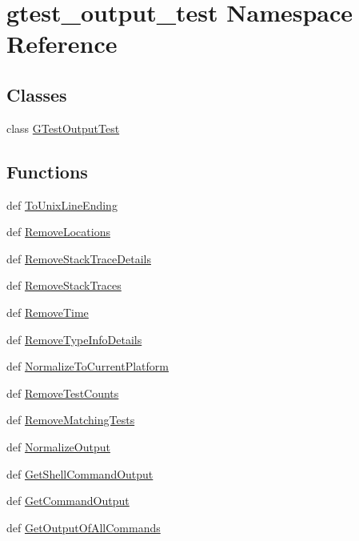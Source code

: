 \hypertarget{namespacegtest__output__test}{\section{gtest\-\_\-output\-\_\-test \-Namespace \-Reference}
\label{d6/dc2/namespacegtest__output__test}
}
\subsection*{\-Classes}
\begin{DoxyCompactItemize}
\item 
class \hyperlink{classgtest__output__test_1_1GTestOutputTest}{\-G\-Test\-Output\-Test}
\end{DoxyCompactItemize}
\subsection*{\-Functions}
\begin{DoxyCompactItemize}
\item 
def \hyperlink{namespacegtest__output__test_a3454cfbe1dc13123ffc8d35189acfc22}{\-To\-Unix\-Line\-Ending}
\item 
def \hyperlink{namespacegtest__output__test_a121831a3be4499f43226a849460076eb}{\-Remove\-Locations}
\item 
def \hyperlink{namespacegtest__output__test_a06f3f2b9517a19912a1b45c6af00a6fd}{\-Remove\-Stack\-Trace\-Details}
\item 
def \hyperlink{namespacegtest__output__test_a78564bc7c92e26e73b93acdc8af703e5}{\-Remove\-Stack\-Traces}
\item 
def \hyperlink{namespacegtest__output__test_a98f04785c16d829447ccffc63f3b35f1}{\-Remove\-Time}
\item 
def \hyperlink{namespacegtest__output__test_a0c15aa843eff7b1df244c46cca13ea57}{\-Remove\-Type\-Info\-Details}
\item 
def \hyperlink{namespacegtest__output__test_a20cf98e6d794a2c732acc6a8b13f3c4c}{\-Normalize\-To\-Current\-Platform}
\item 
def \hyperlink{namespacegtest__output__test_adee32bbc6a50383452627c3c4888231a}{\-Remove\-Test\-Counts}
\item 
def \hyperlink{namespacegtest__output__test_a49e9b498f20bb00261d74e752c1e231d}{\-Remove\-Matching\-Tests}
\item 
def \hyperlink{namespacegtest__output__test_ab48290651c02da54b54a0e1a52afde80}{\-Normalize\-Output}
\item 
def \hyperlink{namespacegtest__output__test_a52d428b680879fbe96182f7db8ae738e}{\-Get\-Shell\-Command\-Output}
\item 
def \hyperlink{namespacegtest__output__test_a538ef64ef4ec54fa01ac5b790dce1094}{\-Get\-Command\-Output}
\item 
def \hyperlink{namespacegtest__output__test_a9d3e73851ab6b1d226fc584036025839}{\-Get\-Output\-Of\-All\-Commands}
\end{DoxyCompactItemize}
